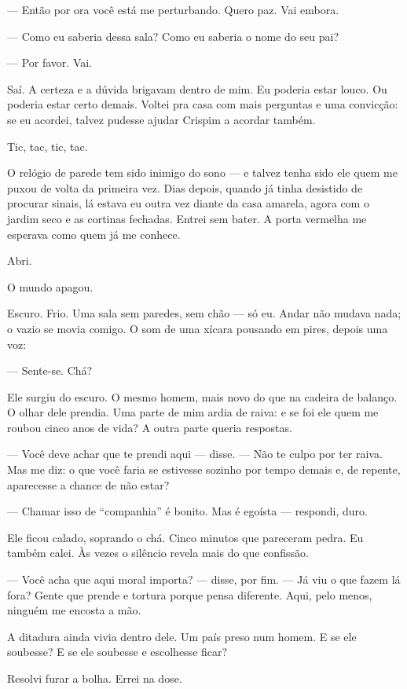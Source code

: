 — Então por ora você está me perturbando. Quero paz. Vai embora.

— Como eu saberia dessa sala? Como eu saberia o nome do seu pai?

— Por favor. Vai.

Saí. A certeza e a dúvida brigavam dentro de mim. Eu poderia estar louco. Ou poderia estar certo demais. Voltei pra casa com mais perguntas e uma convicção: se eu acordei, talvez pudesse ajudar Crispim a acordar também.

Tic, tac, tic, tac.

O relógio de parede tem sido inimigo do sono — e talvez tenha sido ele quem me puxou de volta da primeira vez. Dias depois, quando já tinha desistido de procurar sinais, lá estava eu outra vez diante da casa amarela, agora com o jardim seco e as cortinas fechadas. Entrei sem bater. A porta vermelha me esperava como quem já me conhece.

Abri.

O mundo apagou.

\medskip

Escuro. Frio. Uma sala sem paredes, sem chão — só eu. Andar não mudava nada; o vazio se movia comigo. O som de uma xícara pousando em pires, depois uma voz:

— Sente-se. Chá?

Ele surgiu do escuro. O mesmo homem, mais novo do que na cadeira de balanço. O olhar dele prendia. Uma parte de mim ardia de raiva: e se foi ele quem me roubou cinco anos de vida? A outra parte queria respostas.

— Você deve achar que te prendi aqui — disse. — Não te culpo por ter raiva. Mas me diz: o que você faria se estivesse sozinho por tempo demais e, de repente, aparecesse a chance de não estar?

— Chamar isso de “companhia” é bonito. Mas é egoísta — respondi, duro.

Ele ficou calado, soprando o chá. Cinco minutos que pareceram pedra. Eu também calei. Às vezes o silêncio revela mais do que confissão.

— Você acha que aqui moral importa? — disse, por fim. — Já viu o que fazem lá fora? Gente que prende e tortura porque pensa diferente. Aqui, pelo menos, ninguém me encosta a mão.

A ditadura ainda vivia dentro dele. Um país preso num homem. E se ele soubesse? E se ele soubesse e escolhesse ficar?

Resolvi furar a bolha. Errei na dose.


